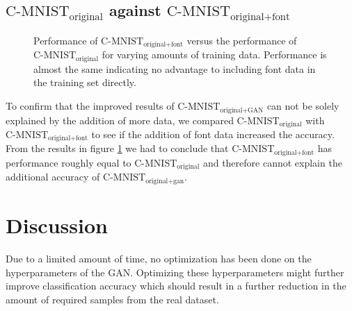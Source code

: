 \documentclass[10pt,twocolumn,letterpaper]{article}
\begin{document}
\subsection{$\text{C-MNIST}_\text{original}$ against $\text{C-MNIST}_\text{original+font}$}
\begin{figure}
\begin{center}
\end{center}
   \caption{Performance of $\text{C-MNIST}_\text{original+font}$ versus the performance of $\text{C-MNIST}_\text{original}$ for varying amounts of training data. Performance is almost the same indicating no advantage to including font data in the training set directly.}
\label{fig:graph-font-original-comparison}
\end{figure}

To confirm that the improved results of $\text{C-MNIST}_\text{original+GAN}$ can not be solely explained by the addition of more data, we compared $\text{C-MNIST}_\text{original}$ with $\text{C-MNIST}_\text{original+font}$ to see if the addition of font data increased the accuracy. From the results in figure \ref{fig:graph-font-original-comparison} we had to conclude that $\text{C-MNIST}_\text{original+font}$ has performance roughly equal to $\text{C-MNIST}_\text{original}$ and therefore cannot explain the additional accuracy of $\text{C-MNIST}_\text{original+gan}$.

\section{Discussion}

Due to a limited amount of time, no optimization has been done on the hyperparameters of the GAN. Optimizing these hyperparameters might further improve classification accuracy which should result in a further reduction in the amount of required samples from the real dataset.
\end{document}
